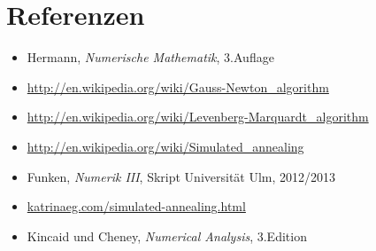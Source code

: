

	\section{Referenzen} %
	\label{sec:referenzen}

		\begin{itemize}[label=$\circ$]
			\item Hermann, \textit{Numerische Mathematik}, 3.Auflage
			\item \url{http://en.wikipedia.org/wiki/Gauss-Newton_algorithm}
			\item \url{http://en.wikipedia.org/wiki/Levenberg-Marquardt_algorithm}
			\item \url{http://en.wikipedia.org/wiki/Simulated_annealing}
			\item Funken, \textit{Numerik III}, Skript Universität Ulm, 2012/2013
			\item \url{katrinaeg.com/simulated-annealing.html}
			\item Kincaid und Cheney, \textit{Numerical Analysis}, 3.Edition
		\end{itemize}



	